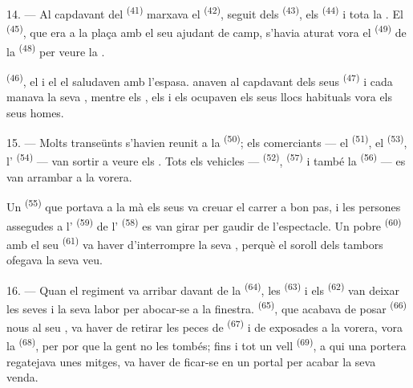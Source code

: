 14. --- Al capdavant del  \textsuperscript{(41)} marxava el
 \textsuperscript{(42)}, seguit dels 
\textsuperscript{(43)}, els  \textsuperscript{(44)} i tota la
. El  \textsuperscript{(45)}, que era a la plaça amb
el seu ajudant de camp, s'havia aturat vora el  \textsuperscript{(49)} de la
 \textsuperscript{(48)} per veure la
.

 \textsuperscript{(46)}, el  i
el  el saludaven amb l'espasa.  anaven al
capdavant dels seus  \textsuperscript{(47)} i cada
 manava la seva , mentre els ,
els  i els  ocupaven els seus llocs habituals vora els
seus homes.

15. --- Molts transeünts s'havien reunit a la  \textsuperscript{(50)}; els
comerciants --- el  \textsuperscript{(51)}, el 
\textsuperscript{(53)}, l' \textsuperscript{(54)} --- van sortir a veure els
. Tots els vehicles ---  \textsuperscript{(52)},
 \textsuperscript{(57)} i també la 
\textsuperscript{(56)} --- es van arrambar a la vorera.

\VUsaut{3.0mm}

Un  \textsuperscript{(55)} que portava a la mà els seus
 va creuar el carrer a bon pas, i les persones
assegudes a l' \textsuperscript{(59)} de l'
\textsuperscript{(58)} es van girar per gaudir de l'espectacle. Un pobre
 \textsuperscript{(60)} amb el seu 
\textsuperscript{(61)} va haver d'interrompre la seva , perquè el soroll dels
tambors ofegava la seva veu.

16. --- Quan el regiment va arribar davant de la 
\textsuperscript{(64)}, les  \textsuperscript{(63)} i els
 \textsuperscript{(62)} van deixar les seves  i la seva labor per abocar-se a la finestra. 
\textsuperscript{(65)}, que acabava de posar  \textsuperscript{(66)} nous al
seu , va haver de retirar les peces de  \textsuperscript{(67)} i
de  exposades a la vorera, vora la 
\textsuperscript{(68)}, per por que la gent no les tombés; fins i tot un vell 
\textsuperscript{(69)}, a qui una portera regatejava unes mitges, va haver de ficar-se en un
portal per acabar la seva venda.

